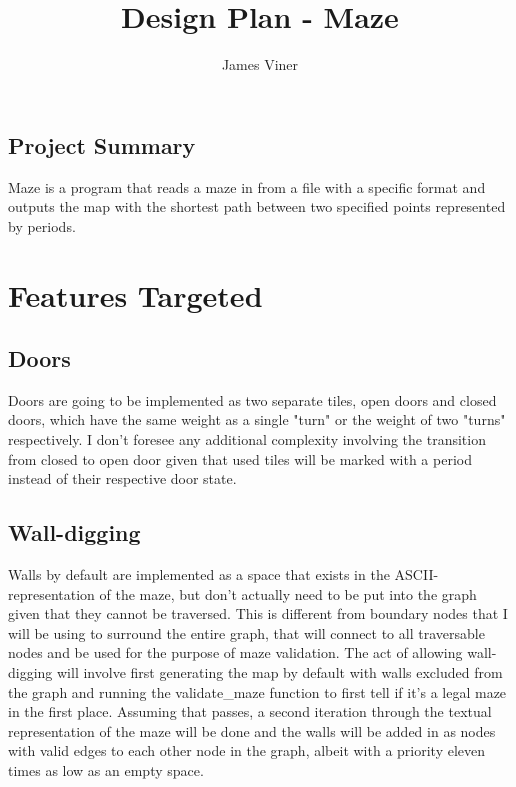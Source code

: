 \documentclass[11pt]{report}
\begin{document}
\title{Design Plan - Maze}
\author{James Viner}
\date{} %
\maketitle

\doublespacing

\vspace*{\fill}
\begin{center}
\section*{\textbf{Project Summary}}
Maze is a program that reads a maze in from a file with a specific format and outputs the map with the shortest path between two specified points represented by periods.
\end{center}
\vfill
\pagebreak
\section*{Features Targeted}
\subsection*{Doors}
Doors are going to be implemented as two separate tiles, open doors and closed doors, which have the same weight as a single "turn" or the weight of two "turns" respectively. I don't foresee any additional complexity involving the transition from closed to open door given that used tiles will be marked with a period instead of their respective door state.
\subsection*{Wall-digging}
Walls by default are implemented as a space that exists in the ASCII-representation of the maze, but don't actually need to be put into the graph given that they cannot be traversed. This is different from boundary nodes that I will be using to surround the entire graph, that will connect to all traversable nodes and be used for the purpose of maze validation. The act of allowing wall-digging will involve first generating the map by default with walls excluded from the graph and running the validate\_maze function to first tell if it's a legal maze in the first place. Assuming that passes, a second iteration through the textual representation of the maze will be done and the walls will be added in as nodes with valid edges to each other node in the graph, albeit with a priority eleven times as low as an empty space.
\end{document}
